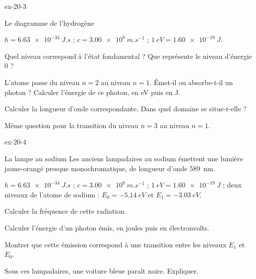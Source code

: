\begin{blocLivre}{ex-20-3}
\begin{exercice}[1]{Le diagramme de l'hydrogène}
\begin{donnees}
$h=\qty{6,63e-34}{J.s}$ ; $c=\qty{3,00e8}{m.s^{-1}}$ ; $\qty{1}{eV}=\qty{1,60e-19}{J}$.
\end{donnees}
\begin{questions}
\item Quel niveau correspond à l'état fondamental ? Que représente le niveau d'énergie 0 ?
\item L'atome passe du niveau $n=2$ au niveau $n=1$. Émet-il ou absorbe-t-il un photon ? Calculer l'énergie de ce photon, en eV puis en J.
\item Calculer la longueur d'onde correspondante. Dans quel domaine se situe-t-elle ?
\item Même question pour la transition du niveau $n=3$ au niveau $n=1$.
\end{questions}
\end{exercice}
\end{blocLivre}
\begin{blocLivre}{ex-20-4}
\begin{exercice}[1]{La lampe au sodium}
Les anciens lampadaires au sodium émettent une lumière jaune-orangé presque monochromatique, de longueur d'onde \qty{589}{nm}.
\begin{donnees}
$h=\qty{6,63e-34}{J.s}$ ; $c=\qty{3,00e8}{m.s^{-1}}$ ; $\qty{1}{eV}=\qty{1,60e-19}{J}$ ; deux niveaux de l'atome de sodium : $E_0=\qty{-5,14}{eV}$ et
$E_1=\qty{-3,03}{eV}$.
\end{donnees}
\begin{questions}
\item Calculer la fréquence de cette radiation.
\item Calculer l'énergie d'un photon émis, en joules puis en électronvolts.
\item Montrer que cette émission correspond à une transition entre les niveaux $E_1$ et $E_0$.
\item Sous ces lampadaires, une voiture bleue paraît noire. Expliquer.
\end{questions}
\end{exercice}
\end{blocLivre}
